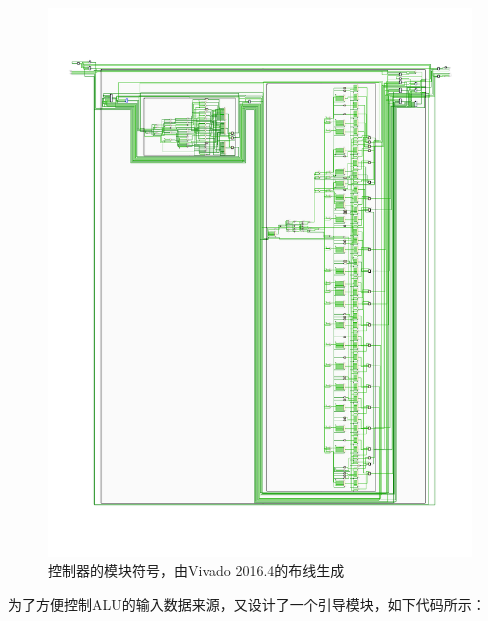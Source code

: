 \documentclass[titlepage, 11pt]{article}
\begin{document}
			\begin{figure}[H]
				\centering
				\includegraphics[scale=1.8]{30.pdf}
				\caption{控制器的模块符号，由Vivado 2016.4的布线生成}
			\end{figure}
		为了方便控制ALU的输入数据来源，又设计了一个引导模块，如下代码所示：
\end{document}

